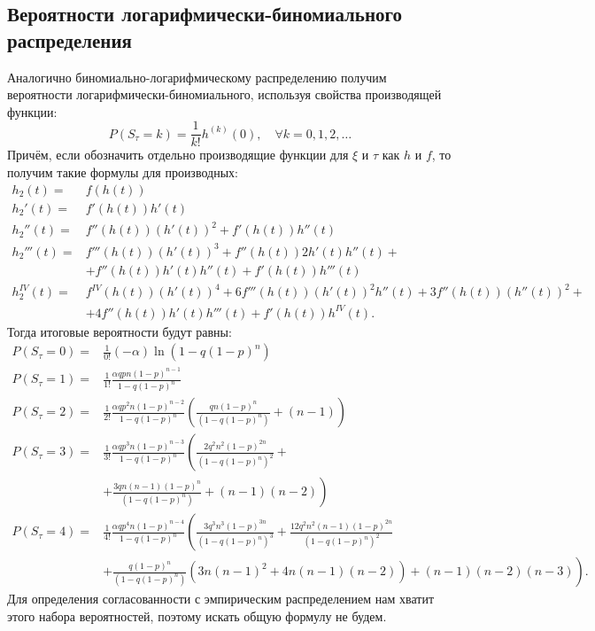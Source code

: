 \documentclass[12pt, specialist, subf, substylefile = spbu.rtx]{disser}
\begin{document}
	\subsection{Вероятности логарифмически-биномиального распределения}
	
	Аналогично биномиально-логарифмическому распределению получим вероятности логарифмически-биномиального, используя свойства производящей функции: 
	\[
		P(S _\tau = k) = \frac {1} {k!} h ^{(k)} (0), \quad \forall k = 0, 1, 2, \dots
	\]
	Причём, если обозначить отдельно производящие функции для $ \xi $ и $ \tau $ как $ h $ и $ f $, то получим такие формулы для производных:
	\[
		\begin{aligned}
		 	h _2(t)=& f(h(t))\\
		 	h _2'(t)=& f'(h(t))h'(t)\\
		 	h _2''(t)=& f''(h(t))(h'(t))^2+f'(h(t))h''(t)\\
		 	h _2'''(t)=& f'''(h(t))(h'(t))^3+f''(h(t))2h'(t)h''(t)+\\
		 	& +f''(h(t))h'(t)h''(t)+f'(h(t))h'''(t)\\
		 	h _2^{IV}(t)=& f^{IV}(h(t))(h'(t))^4+6f'''(h(t))(h'(t))^2h''(t)+3f''(h(t))(h''(t))^2+\\
		 	& +4f''(h(t))h'(t)h'''(t)+f'(h(t))h^{IV}(t).
		\end{aligned}
	\]
	Тогда итоговые вероятности будут равны:
	\[
		\begin{aligned}
		 	P(S _\tau = 0)=& \frac 1 {0!} (-\alpha) \ln (1 - q (1 - p) ^n)\\
		 	P(S _\tau = 1)=& \frac 1 {1!} \frac {\alpha q p n (1 - p) ^{n - 1}} {1 - q (1 - p) ^n}\\
		 	P(S _\tau = 2)=& \frac 1 {2!} \frac {\alpha q p ^2 n (1 - p) ^{n - 2}} {1 - q (1 - p) ^n} \left( \frac {qn (1 - p) ^n} {(1 - q (1 - p) ^n)} + (n - 1) \right)\\
		 	P(S _\tau = 3)=& \frac 1 {3!} \frac {\alpha q p ^3 n (1 - p) ^{n - 3}} {1 - q (1 - p) ^n} \left( \frac {2q^2n^2 (1 - p) ^{2n}} {(1 - q (1 - p) ^n)^2} +\right.\\
		 	&\left.+ \frac {3qn (n - 1) (1 - p) ^n} {(1 - q (1 - p) ^n)} + (n - 1)(n - 2) \right)\\
		 	P(S _\tau = 4)=& \frac 1 {4!} \frac {\alpha q p ^4 n (1 - p) ^{n - 4}} {1 - q (1 - p) ^n} \left( \frac {3q^3n^3 (1 - p) ^{3n}} {(1 - q (1 - p) ^n)^3} + \frac {12q^2n^2 (n - 1) (1 - p) ^{2n}} {(1 - q (1 - p) ^n)^2}\right.\\
		 	&\left.+ \frac {q(1 - p) ^{n}} {(1 - q (1 - p) ^n)}\left(3n(n - 1) ^2 + 4n(n - 1)(n - 2)\right) + (n - 1)(n - 2)(n - 3) \right).
		\end{aligned}
	\]
	Для определения согласованности с эмпирическим распределением нам хватит этого набора вероятностей, поэтому искать общую формулу не будем.
	
\end{document}
